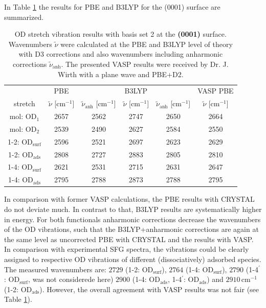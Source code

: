\documentclass[11pt,DIV=13,BCOR=5mm,a4paper,headinclude]{scrbook}
\begin{document}
In Table \ref{tab:freqs_0001_crystal} the results for PBE and B3LYP for the (0001) surface are summarized.
\begin{table}[!h]
  \centering
  \caption{OD stretch vibration results with basis set 2 at the \textbf{(0001)} surface.
Wavenumbers $\tilde{\nu}$ were calculated at the PBE and B3LYP level of theory with D3 corrections and also wavenumbers including anharmonic corrections $\tilde{\nu}_\textrm{anh}$.
The presented VASP results were received by Dr. J. Wirth with a plane wave and PBE+D2.}
  \begin{tabular}{ccc|cc|c}
  \toprule
   & PBE & & B3LYP & &VASP PBE\\
  stretch & $\tilde{\nu}$ [cm$^{-1}$] &$\tilde{\nu}_\textrm{anh}$ [cm$^{-1}$] &$\tilde{\nu}$ [cm$^{-1}$] & $\tilde{\nu}_\textrm{anh}$ [cm$^{-1}$]& $\tilde{\nu}$ [cm$^{-1}$]\\\midrule
  mol: OD$_{\textrm{1}}$    &2657 &2562 &2747 &2650 & 2664\\
  mol: OD$_{\textrm{2}}$    &2539 &2490 &2627 &2584 & 2550\\
  1-2: OD$_{\textrm{surf}}$ &2596 &2521 &2697 &2623 & 2629\\%
  1-2: OD$_{\textrm{ads}}$  &2808 &2727 &2883 &2805 & 2810\\%
  1-4: OD$_{\textrm{surf}}$ &2621 &2531 &2715 &2631 & 2647\\%
  1-4: OD$_{\textrm{ads}}$  &2795 &2788 &2873 &2788 & 2795\\%
  \bottomrule
    \end{tabular}
  \label{tab:freqs_0001_crystal}
\end{table}
In comparison with former VASP calculations, the PBE results with CRYSTAL do not deviate much.
In contrast to that, B3LYP results are systematically higher in energy.
For both functionals anharmonic corrections decrease the wavenumbers of the OD vibrations, such that the B3LYP+anharmonic corrections are again at the same level as uncorrected PBE with CRYSTAL and the results with VASP.
In comparison with experimental SFG spectra\cite{Wirth2014}, the vibrations could be clearly assigned to respective OD vibrations of different (dissociatively) adsorbed species.
The measured wavenumbers are: $2729$ (1-2: OD$_{\textrm{surf}}$), $2764$ (1-4: OD$_{\textrm{surf}}$), $2790$ (1-4$^\prime$: OD$_{\textrm{surf}}$, was not considerede here) $2900$ (1-4: OD$_{\textrm{ads}}$, 1-4$^\prime$: OD$_{\textrm{ads}}$) and $2910\,$cm$^{-1}$ (1-2: OD$_{\textrm{ads}}$).
However, the overall agreement with VASP results was not fair (see Table \ref{tab:freqs_0001_crystal}).
\end{document}
